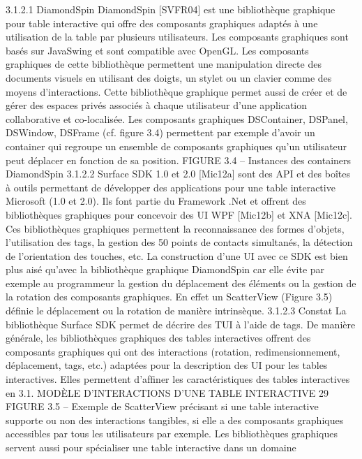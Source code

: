 \documentclass{article}
\begin{document}
3.1.2.1
DiamondSpin
DiamondSpin [SVFR04] est une biblioth\`{e}que graphique pour table interactive qui offre des composants graphiques adapt\'{e}s \`{a} une utilisation de la table par plusieurs utilisateurs. Les composants graphiques sont bas\'{e}s sur JavaSwing et sont compatible avec OpenGL. Les composants graphiques de
cette biblioth\`{e}que permettent une manipulation directe des documents visuels en utilisant des doigts,
un stylet ou un clavier comme des moyens d’interactions. Cette biblioth\`{e}que graphique permet aussi
de cr\'{e}er et de g\'{e}rer des espaces priv\'{e}s associ\'{e}s \`{a} chaque utilisateur d’une application collaborative
et co-localis\'{e}e. Les composants graphiques DSContainer, DSPanel, DSWindow, DSFrame (cf. ﬁgure
3.4) permettent par exemple d’avoir un container qui regroupe un ensemble de composants graphiques
qu’un utilisateur peut d\'{e}placer en fonction de sa position.
FIGURE 3.4 – Instances des containers DiamondSpin
3.1.2.2
Surface SDK 1.0 et 2.0
[Mic12a] sont des API et des bo\^{i}tes \`{a} outils permettant de d\'{e}velopper des applications pour une
table interactive Microsoft (1.0 et 2.0). Ils font partie du Framework .Net et offrent des biblioth\`{e}ques
graphiques pour concevoir des UI WPF [Mic12b] et XNA [Mic12c]. Ces biblioth\`{e}ques graphiques
permettent la reconnaissance des formes d’objets, l’utilisation des tags, la gestion des 50 points de
contacts simultan\'{e}s, la d\'{e}tection de l’orientation des touches, etc. La construction d’une UI avec ce
SDK est bien plus ais\'{e} qu’avec la biblioth\`{e}que graphique DiamondSpin car elle \'{e}vite par exemple
au programmeur la gestion du d\'{e}placement des \'{e}l\'{e}ments ou la gestion de la rotation des composants
graphiques. En effet un ScatterView (Figure 3.5) d\'{e}ﬁnie le d\'{e}placement ou la rotation de mani\`{e}re
intrins\`{e}que.
3.1.2.3
Constat
La biblioth\`{e}que Surface SDK permet de d\'{e}crire des TUI \`{a} l’aide de tags. De mani\`{e}re g\'{e}n\'{e}rale,
les biblioth\`{e}ques graphiques des tables interactives offrent des composants graphiques qui ont des
interactions (rotation, redimensionnement, d\'{e}placement, tags, etc.) adapt\'{e}es pour la description des
UI pour les tables interactives. Elles permettent d’afﬁner les caract\'{e}ristiques des tables interactives en
3.1. MODÈLE D’INTERACTIONS D’UNE TABLE INTERACTIVE
29
FIGURE 3.5 – Exemple de ScatterView
pr\'{e}cisant si une table interactive supporte ou non des interactions tangibles, si elle a des composants
graphiques accessibles par tous les utilisateurs par exemple.
Les biblioth\`{e}ques graphiques servent aussi pour sp\'{e}cialiser une table interactive dans un domaine
\end{document}
